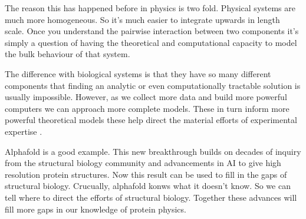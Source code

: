 The reason this has happened before in physics is two fold. Physical systems are much more homogeneous. So it's much easier to integrate upwards in length scale. Once you understand the pairwise interaction between two components it's simply a question of having the theoretical and computational capacity to model the bulk behaviour of that system. 

The difference with biological systems is that they have so many different components that finding an analytic or even computationally tractable solution is usually impossible. However, as we collect more data and build more powerful computers we can approach more complete models. These in turn inform more powerful theoretical models these help direct the material efforts of experimental expertise . 

Alphafold is a good example. This new breakthrough builds on decades of inquiry from the structural biology community and advancements in AI to give high resolution protein structures. Now this result can be used to fill in the gaps of structural biology. Crucually, alphafold konws what it doesn't know. So we can tell where to direct the efforts of structural biology. Together these advances will fill more gaps in our knowledge of protein physics. 

